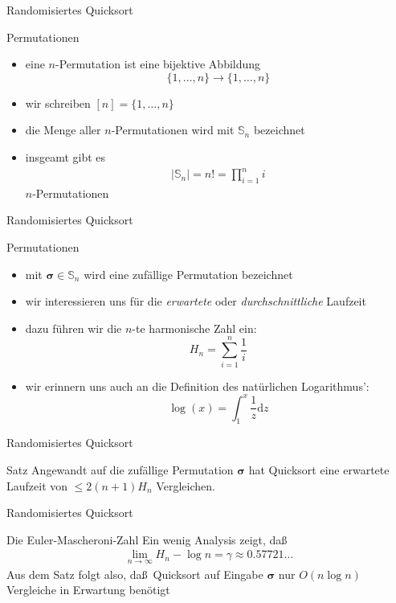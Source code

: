 \documentclass[aspectratio=1610, 11pt]{beamer}
\renewcommand{\vec}[1]{\boldsymbol{#1}}
\newcommand\dd{\mathrm d}
\renewcommand\SS{\mathbb S}
\begin{document}
\begin{frame}{Randomisiertes Quicksort}
\begin{exampleblock}{Permutationen}
	\begin{itemize}
		\item eine $n$-\alert{Permutation} ist eine bijektive Abbildung $$\{1,\ldots,n\}\to\{1,\ldots,n\}$$
		\item wir schreiben $[n]=\{1,\ldots,n\}$
		\item die Menge aller $n$-Permutationen wird mit $\SS_n$ bezeichnet
		\item insgeamt gibt es
			\begin{align*}
				|\SS_n|=n!=\prod_{i=1}^ni
			\end{align*}
			$n$-Permutationen
	\end{itemize}
	\end{exampleblock}
\end{frame}

\begin{frame}{Randomisiertes Quicksort}
\begin{exampleblock}{Permutationen}
	\begin{itemize}
		\item mit $\vec\sigma\in\SS_n$ wird eine \alert{zuf\"allige} Permutation bezeichnet
		\item wir interessieren uns f\"ur die \emph{erwartete} oder \emph{durchschnittliche} Laufzeit 
		\item dazu f\"uhren wir die \alert{$n$-te harmonische Zahl} ein:
			$$H_n=\sum_{i=1}^n\frac1i$$
		\item wir erinnern uns auch an die Definition des \alert{nat\"urlichen Logarithmus'}:
			$$\log(x)=\int_1^x\frac1z\dd z$$
	\end{itemize}
	\end{exampleblock}
\end{frame}

\begin{frame}{Randomisiertes Quicksort}
\begin{block}{Satz}
	Angewandt auf die zuf\"allige Permutation $\vec\sigma$ hat Quicksort eine erwartete Laufzeit von $\leq2(n+1)H_n$ Vergleichen.
	\end{block}
\end{frame}

\begin{frame}{Randomisiertes Quicksort}
	\begin{alertblock}{Die Euler-Mascheroni-Zahl}
		Ein wenig Analysis zeigt, da\ss\ 
	\begin{align*}
		\lim_{n\to\infty}H_n-\log n=\gamma\approx0.57721\dots
		\end{align*}
		Aus dem Satz folgt also, da\ss\ Quicksort auf Eingabe $\vec\sigma$ nur $O(n\log n)$ Vergleiche in Erwartung ben\"otigt
	\end{alertblock}
\end{frame}
\end{document}
